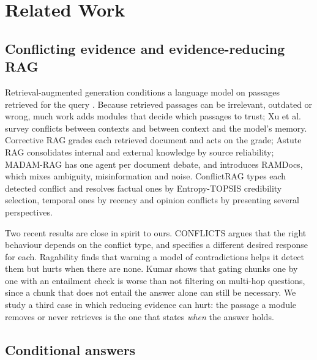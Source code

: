 \section{Related Work}

\subsection{Conflicting evidence and evidence-reducing RAG}

Retrieval-augmented generation conditions a language model on passages retrieved for the query \cite{lewis2020rag}. Because retrieved passages can be irrelevant, outdated or wrong, much work adds modules that decide which passages to trust; Xu et al.\ \cite{xu2024survey} survey conflicts between contexts and between context and the model's memory. Corrective RAG \cite{yan2024crag} grades each retrieved document and acts on the grade; Astute RAG \cite{wang2025astute} consolidates internal and external knowledge by source reliability; MADAM-RAG \cite{wang2025madam} has one agent per document debate, and introduces RAMDocs, which mixes ambiguity, misinformation and noise. ConflictRAG \cite{conflictrag2026} types each detected conflict and resolves factual ones by Entropy-TOPSIS credibility selection, temporal ones by recency and opinion conflicts by presenting several perspectives.

Two recent results are close in spirit to ours. CONFLICTS \cite{cattan2025conflicts} argues that the right behaviour depends on the conflict type, and specifies a different desired response for each. Ragability \cite{gross2026ragability} finds that warning a model of contradictions helps it detect them but hurts when there are none. Kumar \cite{kumar2026verification} shows that gating chunks one by one with an entailment check is worse than not filtering on multi-hop questions, since a chunk that does not entail the answer alone can still be necessary. We study a third case in which reducing evidence can hurt: the passage a module removes or never retrieves is the one that states \emph{when} the answer holds.

\subsection{Conditional answers}

